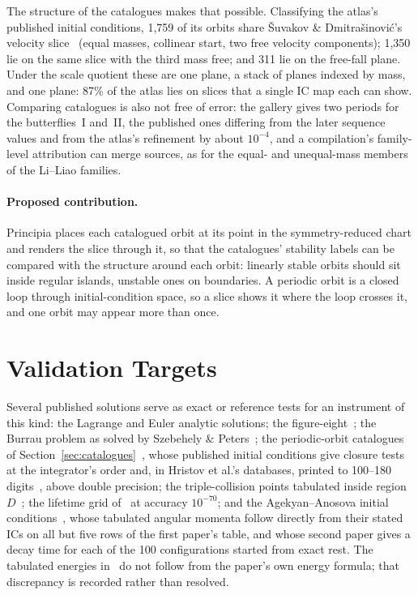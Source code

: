 \documentclass[11pt,a4paper]{article}
\begin{document}
The structure of the catalogues makes that possible.  Classifying the atlas's published initial
conditions, 1,759 of its orbits share \v{S}uvakov \& Dmitra\v{s}inovi\'{c}'s velocity
slice~\cite{suvakov2013} (equal masses, collinear start, two free velocity components); 1,350 lie on
the same slice with the third mass free; and 311 lie on the free-fall plane.  Under the scale
quotient these are one plane, a stack of planes indexed by mass, and one plane: 87\% of the atlas
lies on slices that a single IC map each can show.  Comparing catalogues is also not free of
error: the gallery gives two periods for the butterflies~I and~II, the published ones differing
from the later sequence values and from the atlas's refinement by about $10^{-4}$, and a
compilation's family-level attribution can merge sources, as for the equal- and unequal-mass
members of the Li--Liao families.

\paragraph{Proposed contribution.}
Principia places each catalogued orbit at its point in the symmetry-reduced chart and renders the
slice through it, so that the catalogues' stability labels can be compared with the structure
around each orbit: linearly stable orbits should sit inside regular islands, unstable ones on
boundaries.  A periodic orbit is a closed loop through initial-condition space, so a slice shows it
where the loop crosses it, and one orbit may appear more than once.

\section{Validation Targets}

Several published solutions serve as exact or reference tests for an instrument of this kind:
the Lagrange and Euler analytic solutions; the figure-eight~\cite{moore1993,chenciner2000}; the
Burrau problem as solved by Szebehely \& Peters~\cite{szebehely1967}; the periodic-orbit
catalogues of Section~\ref{sec:catalogues}~\cite{suvakov2013,suvakov2014,threebodygallery,hudomal2019,li2018,hristov2024,tbo2026},
whose published initial conditions give closure tests at the integrator's order and, in Hristov et al.'s
databases, printed to 100--180 digits~\cite{hristov2022,hristov2023,hristov2024nc,hristov2026}, above double
precision; the
triple-collision points tabulated inside region $D$~\cite{tanikawa2021}; the lifetime grid of~\cite{boekholt2020}
at accuracy $10^{-70}$; and the
Agekyan--Anosova initial conditions~\cite{agekian1967,agekian1968b}, whose tabulated angular
momenta follow directly from their stated ICs on all but five rows of the first paper's table, and
whose second paper gives a decay time for each of the 100 configurations started from exact rest.  The tabulated energies in~\cite{agekian1967} do
not follow from the paper's own energy formula; that discrepancy is recorded rather than resolved.
\end{document}
